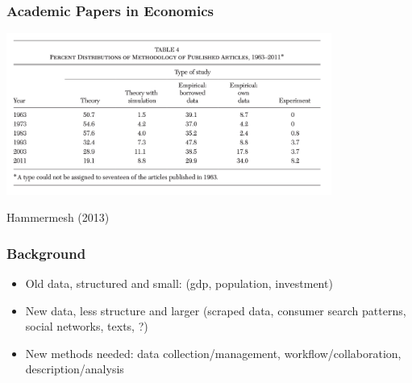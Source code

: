 \documentclass[compress, aspectratio=54]{beamer}
\begin{document}
\begin{frame}
\frametitle{Academic Papers in Economics}

\begin{center}
    \includegraphics[width=0.8\textwidth]{Figures/percent-distribution.png}
\end{center}
Hammermesh (2013)
\end{frame}
\begin{frame}
\frametitle{Background}
\begin{itemize}
\item Old data, structured and small: (gdp, population, investment)
\item New data, less structure and larger (scraped data, consumer search patterns, social networks, texts, ?)
\item New methods needed: data collection/management, workflow/collaboration, description/analysis

\end{itemize}
\end{frame}
\end{document}
